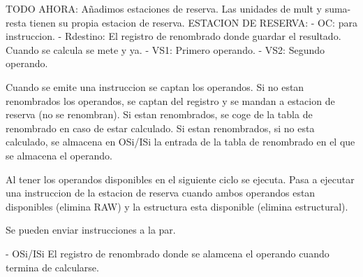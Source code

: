 TODO AHORA:
Añadimos estaciones de reserva. Las unidades de mult y suma-resta tienen su propia estacion de reserva.
ESTACION DE RESERVA:
- OC: para instruccion.
- Rdestino: El registro de renombrado donde guardar el resultado. Cuando se calcula se mete y ya.
- VS1: Primero operando.
- VS2: Segundo operando.

Cuando se emite una instruccion se captan los operandos.
Si no estan renombrados los operandos, se captan del registro y se mandan a estacion de reserva (no se renombran).
Si estan renombrados, se coge de la tabla de renombrado en caso de estar calculado.
Si estan renombrados, si no esta calculado, se almacena en OSi/ISi la entrada de la tabla de renombrado en el que se almacena el operando.

Al tener los operandos disponibles en el siguiente ciclo se ejecuta.
Pasa a ejecutar una instruccion de la estacion de reserva cuando ambos operandos estan disponibles (elimina RAW) y la estructura esta disponible (elimina estructural).

Se pueden enviar instrucciones a la par.

- OSi/ISi El registro de renombrado donde se alamcena el operando cuando termina de calcularse.

